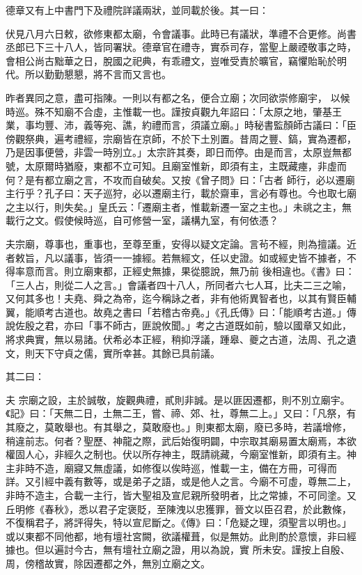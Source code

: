 \begin{pinyinscope}
 德章又有上中書門下及禮院詳議兩狀，並同載於後。其一曰：



 伏見八月六日敕，欲修東都太廟，令會議事。此時已有議狀，準禮不合更修。尚書丞郎已下三十八人，皆同署狀。德章官在禮寺，實忝司存，當聖上嚴禋敬事之時，會相公尚古黜華之日，脫國之祀典，有乖禮文，豈唯受責於曠官，竊懼貽恥於明代。所以勤勤懇懇，將不言而又言也。



 昨者異同之意，盡可指陳。一則以有都之名，便合立廟；次同欲崇修廟宇，
 以候時巡。殊不知廟不合虛，主惟載一也。謹按貞觀九年詔曰：「太原之地，肇基王業，事均豐、沛，義等宛、譙，約禮而言，須議立廟。」時秘書監顏師古議曰：「臣傍觀祭典，遍考禮經，宗廟皆在京師，不於下土別置。昔周之豐、鎬，實為遷都，乃是因事便營，非雲一時別立。」太宗許其奏，即日而停。由是而言，太原豈無都號，太原爾時猶廢，東都不立可知。且廟室惟新，即須有主，主既藏瘞，非虛而何？是有都立廟之言，不攻而自破矣。又按《曾子問》曰：「古者
 師行，必以遷廟主行乎？孔子曰：天子巡狩，必以遷廟主行，載於齋車，言必有尊也。今也取七廟之主以行，則失矣。」皇氏云：「遷廟主者，惟載新遷一室之主也。」未祧之主，無載行之文。假使候時巡，自可修營一室，議構九室，有何依憑？



 夫宗廟，尊事也，重事也，至尊至重，安得以疑文定論。言茍不經，則為擅議。近者敕旨，凡以議事，皆須一一據經。若無經文，任以史證。如或經史皆不據者，不得率意而言。則立廟東都，正經史無據，果從臆說，無乃前
 後相違也。《書》曰：「三人占，則從二人之言。」會議者四十八人，所同者六七人耳，比夫二三之喻，又何其多也！夫堯、舜之為帝，迄今稱詠之者，非有他術異智者也，以其有賢臣輔翼，能順考古道也。故堯之書曰「若稽古帝堯。」《孔氏傳》曰：「能順考古道。」傳說佐殷之君，亦曰「事不師古，匪說攸聞。」考之古道既如前，驗以國章又如此，將求典實，無以易諸。伏希必本正經，稍抑浮議，踵皋、夔之古道，法周、孔之遺文，則天下守貞之儒，實所幸甚。其餘已具前議。



 其二曰：



 夫
 宗廟之設，主於誠敬，旋觀典禮，貳則非誠。是以匪因遷都，則不別立廟宇。《記》曰：「天無二日，土無二王，嘗、禘、郊、社，尊無二上。」又曰：「凡祭，有其廢之，莫敢舉也。有其舉之，莫敢廢也。」則東都太廟，廢已多時，若議增修，稍違前志。何者？聖歷、神龍之際，武后始復明闢，中宗取其廟易置太廟焉，本欲權固人心，非經久之制也。伏以所存神主，既請祧藏，今廟室惟新，即須有主。神主非時不造，廟寢又無虛議，如修復以俟時巡，惟載一主，備在方冊，可得而
 詳。又引經中義有數等，或是弟子之語，或是他人之言。今廟不可虛，尊無二上，非時不造主，合載一主行，皆大聖祖及宣尼親所發明者，比之常據，不可同塗。又丘明修《春秋》，悉以君子定褒貶，至陳洩以忠獲罪，晉文以臣召君，於此數條，不復稱君子，將評得失，特以宣尼斷之。《傳》曰：「危疑之理，須聖言以明也。」或以東都不同他都，地有壇社宮闕，欲議權葺，似是無妨。此則酌於意懷，非曰經據也。但以遍討今古，無有壇社立廟之證，用以為說，實
 所未安。謹按上自殷、周，傍稽故實，除因遷都之外，無別立廟之文。




\end{pinyinscope}
